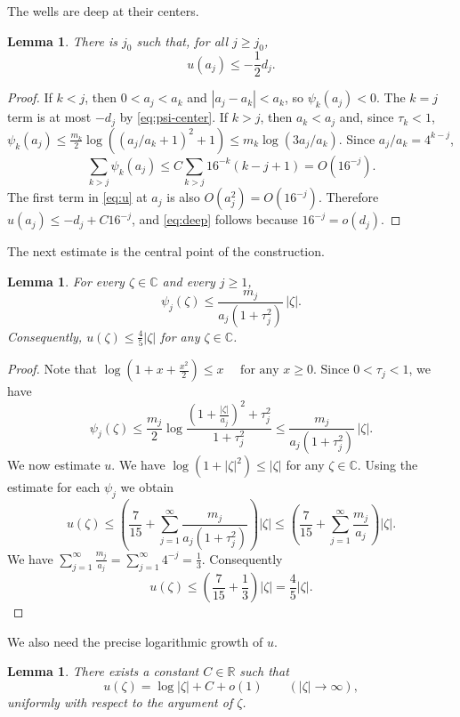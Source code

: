\documentclass{amsart}
\newcommand{\C}{\mathbb C}
\newtheorem{lemma}[theorem]{Lemma}
\theoremstyle{remark}
\begin{document}
The wells are deep at their centers.

\begin{lemma}\label{lem:deep}
There is $j_0$ such that, for all $j\ge j_0$,
\begin{equation}\label{eq:deep}
 u(a_j)\le-\frac12d_j.
\end{equation}
\end{lemma}

\begin{proof}
If $k<j$, then $0<a_j<a_k$ and $|a_j-a_k|<a_k$, so $\psi_k(a_j)<0$. The $k=j$ term is at most $-d_j$ by \eqref{eq:psi-center}. If $k>j$, then $a_k<a_j$ and, since $\tau_k<1$,
$\psi_k(a_j)\le \frac{m_k}{2}\log((a_j/a_k+1)^2+1)\le m_k\log(3a_j/a_k)$.
Since $a_j/a_k=4^{k-j}$,
\[
 \sum_{k>j}\psi_k(a_j)\le C\sum_{k>j}16^{-k}(k-j+1)=O(16^{-j}).
\]
The first term in \eqref{eq:u} at $a_j$ is also $O(a_j^2)=O(16^{-j})$. Therefore $u(a_j)\le-d_j+C16^{-j}$, and \eqref{eq:deep} follows because $16^{-j}=o(d_j)$.
\end{proof}

The next estimate is the central point of the construction. 
\begin{lemma}\label{lem:sublevel}
For every $\zeta\in\mathbb C$ and every $j\ge1$,
\[
 \psi_j(\zeta)\le
 \frac{m_j}{a_j(1+\tau_j^2)}\,|\zeta|.
\]
Consequently,
$u(\zeta)\le \frac45|\zeta|$ for any $\zeta\in\mathbb C$.
\end{lemma}

\begin{proof} Note that
$\log(1+x+\frac{x^2}{2})\le x\quad\text{ for any }x\ge0$. Since $0<\tau_j<1$, we have
\[
 \psi_j(\zeta)
 \le \frac{m_j}{2}
 \log\frac{(1+\frac{|\zeta|}{a_j})^2+\tau_j^2}{1+\tau_j^2}\le \frac{m_j}{a_j(1+\tau_j^2)}\,|\zeta|.
\]
We now estimate $u$. We have  
$\log(1+|\zeta|^2)\le |\zeta|$ for any $\zeta\in\C$.
Using the estimate for each $\psi_j$ we obtain
$$ 
u(\zeta)
 \le \left(
 \frac{7}{15}
 +\sum_{j=1}^{\infty}
 \frac{m_j}{a_j(1+\tau_j^2)}
 \right)|\zeta|\le \left(
 \frac{7}{15}
 +\sum_{j=1}^{\infty}\frac{m_j}{a_j}
 \right)|\zeta|.
$$
We have $\sum_{j=1}^{\infty}\frac{m_j}{a_j}
 =\sum_{j=1}^{\infty}4^{-j}=\frac13$.
Consequently
\[
 u(\zeta)\le
 \left(\frac{7}{15}+\frac13\right)|\zeta|
 =\frac45|\zeta|.
\]
\end{proof}


We also need the precise logarithmic growth of $u$.

\begin{lemma}\label{lem:growth}
There exists a constant $C\in\mathbb R$ such that
\begin{equation}\label{eq:growth}
 u(\zeta)=\log|\zeta|+C+o(1)\qquad(|\zeta|\to\infty),
\end{equation}
uniformly with respect to the argument of $\zeta$.
\end{lemma}
\end{document}
